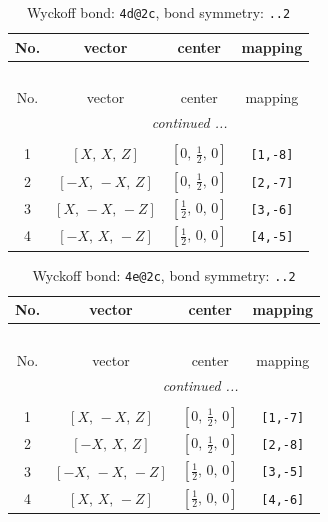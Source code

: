 \documentclass[fleqn,8pt]{jsarticle}
\begin{document}
\begin{longtable}{cccc}
\caption{Wyckoff bond: {\tt 4d@2c}, bond symmetry: {\tt ..2}}
 \\
 \hline \hline
No. & vector & center & mapping \\ \hline \endfirsthead

\multicolumn{3}{l}{\tablename\ \thetable{}} \\
 \hline \hline
No. & vector & center & mapping \\ \hline \endhead

 \hline \hline
\multicolumn{3}{r}{\footnotesize\it continued ...} \\ \endfoot

 \hline \hline
\multicolumn{3}{r}{} \\ \endlastfoot

1 & $\left[ X,\, X,\, Z \right]$ & $\left[ 0,\, \frac{1}{2},\, 0 \right]$ & {\tt [1,-8]} \\ \hline
2 & $\left[ - X,\, - X,\, Z \right]$ & $\left[ 0,\, \frac{1}{2},\, 0 \right]$ & {\tt [2,-7]} \\ \hline
3 & $\left[ X,\, - X,\, - Z \right]$ & $\left[ \frac{1}{2},\, 0,\, 0 \right]$ & {\tt [3,-6]} \\ \hline
4 & $\left[ - X,\, X,\, - Z \right]$ & $\left[ \frac{1}{2},\, 0,\, 0 \right]$ & {\tt [4,-5]} \\
\end{longtable}
\renewcommand{\arraystretch}{1.2}
\begin{longtable}{cccc}
\caption{Wyckoff bond: {\tt 4e@2c}, bond symmetry: {\tt ..2}}
 \\
 \hline \hline
No. & vector & center & mapping \\ \hline \endfirsthead

\multicolumn{3}{l}{\tablename\ \thetable{}} \\
 \hline \hline
No. & vector & center & mapping \\ \hline \endhead

 \hline \hline
\multicolumn{3}{r}{\footnotesize\it continued ...} \\ \endfoot

 \hline \hline
\multicolumn{3}{r}{} \\ \endlastfoot

1 & $\left[ X,\, - X,\, Z \right]$ & $\left[ 0,\, \frac{1}{2},\, 0 \right]$ & {\tt [1,-7]} \\ \hline
2 & $\left[ - X,\, X,\, Z \right]$ & $\left[ 0,\, \frac{1}{2},\, 0 \right]$ & {\tt [2,-8]} \\ \hline
3 & $\left[ - X,\, - X,\, - Z \right]$ & $\left[ \frac{1}{2},\, 0,\, 0 \right]$ & {\tt [3,-5]} \\ \hline
4 & $\left[ X,\, X,\, - Z \right]$ & $\left[ \frac{1}{2},\, 0,\, 0 \right]$ & {\tt [4,-6]} \\
\end{longtable}
\end{document}

